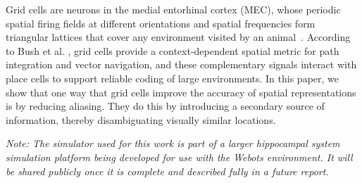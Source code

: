 \documentclass[conference]{IEEEtran}
\begin{document}
Grid cells are neurons in the medial entorhinal cortex (MEC), whose periodic spatial firing fields at different orientations and spatial frequencies form triangular lattices that cover any environment visited by an animal~\cite{bush2014what, hafting2005microstructure}. According to Bush et al. \cite{bush2014what}, grid cells provide a context-dependent spatial metric for path integration and vector navigation, and these complementary signals interact with place cells to support reliable coding of large environments. In this paper, we show that one way that grid cells improve the accuracy of spatial representations is by reducing aliasing. They do this by introducing a secondary source of information, thereby disambiguating visually similar locations.

\textit{Note: The simulator used for this work is part of a larger hippocampal system simulation platform being developed for use with the Webots environment. It will be shared publicly once it is complete and described fully in a future report.}

\end{document}
